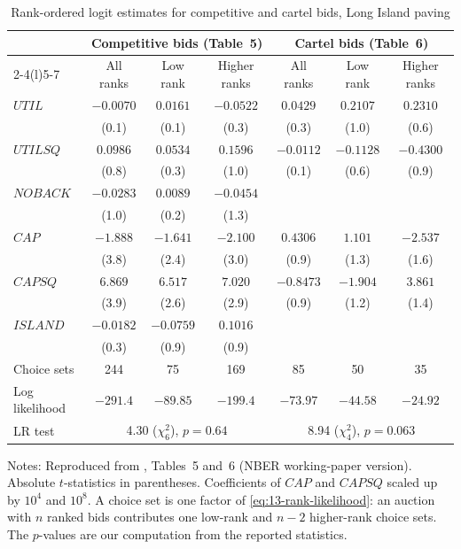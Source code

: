 \begin{table}[htbp]
\centering
\caption{Rank-ordered logit estimates for competitive and cartel bids, Long Island paving}\label{tab:13-pz-tests}
\small
\setlength{\tabcolsep}{5pt}
\begin{tabular}{@{}lcccccc@{}}
\toprule
 & \multicolumn{3}{c}{Competitive bids (Table~5)} & \multicolumn{3}{c}{Cartel bids (Table~6)}\\
\cmidrule(lr){2-4}\cmidrule(l){5-7}
 & All ranks & Low rank & Higher ranks & All ranks & Low rank & Higher ranks\\
\midrule
$\mathit{UTIL}$   & $-0.0070$ & $0.0161$ & $-0.0522$ & $0.0429$ & $0.2107$ & $0.2310$\\
                  & (0.1) & (0.1) & (0.3) & (0.3) & (1.0) & (0.6)\\
$\mathit{UTILSQ}$ & $0.0986$ & $0.0534$ & $0.1596$ & $-0.0112$ & $-0.1128$ & $-0.4300$\\
                  & (0.8) & (0.3) & (1.0) & (0.1) & (0.6) & (0.9)\\
$\mathit{NOBACK}$ & $-0.0283$ & $0.0089$ & $-0.0454$ & & & \\
                  & (1.0) & (0.2) & (1.3) & & & \\
$\mathit{CAP}$    & $-1.888$ & $-1.641$ & $-2.100$ & $0.4306$ & $1.101$ & $-2.537$\\
                  & (3.8) & (2.4) & (3.0) & (0.9) & (1.3) & (1.6)\\
$\mathit{CAPSQ}$  & $6.869$ & $6.517$ & $7.020$ & $-0.8473$ & $-1.904$ & $3.861$\\
                  & (3.9) & (2.6) & (2.9) & (0.9) & (1.2) & (1.4)\\
$\mathit{ISLAND}$ & $-0.0182$ & $-0.0759$ & $0.1016$ & & & \\
                  & (0.3) & (0.9) & (0.9) & & & \\
\midrule
Choice sets    & 244 & 75 & 169 & 85 & 50 & 35\\
Log likelihood & $-291.4$ & $-89.85$ & $-199.4$ & $-73.97$ & $-44.58$ & $-24.92$\\
LR test & \multicolumn{3}{c}{4.30 ($\chi^2_6$), $p = 0.64$} & \multicolumn{3}{c}{8.94 ($\chi^2_4$), $p = 0.063$}\\
\bottomrule
\end{tabular}

\smallskip
\begin{minipage}{0.95\textwidth}\footnotesize
Notes: Reproduced from \citet{PorterZona1993}, Tables~5 and~6 (NBER working-paper version). Absolute
$t$-statistics in parentheses. Coefficients of $\mathit{CAP}$ and $\mathit{CAPSQ}$ scaled up by $10^4$ and $10^8$. A
choice set is one factor of \eqref{eq:13-rank-likelihood}: an auction with $n$ ranked bids contributes one low-rank
and $n-2$ higher-rank choice sets. The $p$-values are our computation from the reported statistics.
\end{minipage}
\end{table}

